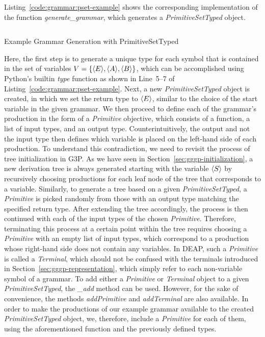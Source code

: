 Listing~\ref{code:grammar:pset-example} shows the corresponding implementation of the function \emph{generate\_grammar}, which generates a \emph{PrimitiveSetTyped} object.
\begin{listing}
	\inputminted[linenos]{python}{evostencils/grammar/pset_example.py}
	\caption{Example Grammar Generation with PrimitiveSetTyped}
	\label{code:grammar:pset-example}
\end{listing}
Here, the first step is to generate a unique type for each symbol that is contained in the set of variables $V = \left\{\langle E \rangle, \langle A \rangle, \langle B \rangle \right\}$, which can be accomplished using Python's builtin \emph{type} function as shown in Line~5--7 of Listing~\ref{code:grammar:pset-example}.
Next, a new \emph{PrimitiveSetTyped} object is created, in which we set the return type to $\langle E \rangle$, similar to the choice of the start variable in the given grammar.
We then proceed to define each of the grammar's production in the form of a \emph{Primitive} objective, which consists of a function, a list of input types, and an output type.
Counterintuitively, the output and not the input type then defines which variable is placed on the left-hand side of each production.
To understand this contradiction, we need to revisit the process of tree initialization in G3P.
As we have seen in Section~\ref{sec:gggp-initialization}, a new derivation tree is always generated starting with the variable $\langle S \rangle$ by recursively choosing productions for each leaf node of the tree that corresponds to a variable.
Similarly, to generate a tree based on a given \emph{PrimitiveSetTyped}, a \emph{Primitive} is picked randomly from those with an output type matching the specified return type.
After extending the tree accordingly, the process is then continued with each of the input types of the chosen \emph{Primitive}.
Therefore, terminating this process at a certain point within the tree requires choosing a \emph{Primitive} with an empty list of input types, which correspond to a production whose right-hand side does not contain any variables.
In DEAP, such a \emph{Primitive} is called a \emph{Terminal}, which should not be confused with the terminals introduced in Section~\ref{sec:gggp-representation}, which simply refer to each non-variable symbol of a grammar.
To add either a \emph{Primitive} or \emph{Terminal} object to a given \emph{PrimitiveSetTyped}, the \emph{\_add} method can be used.
However, for the sake of convenience, the methods \emph{addPrimitive} and \emph{addTerminal} are also available.
In order to make the productions of our example grammar available to the created \emph{PrimitiveSetTyped} object, we, therefore, include a \emph{Primitive} for each of them, using the aforementioned function and the previously defined types.
